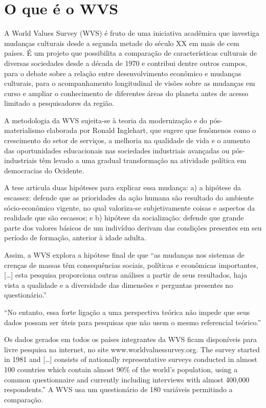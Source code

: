 \documentclass[
  brazil,
]{book}
\begin{document}
\hypertarget{o-que-uxe9-o-wvs}{%
\section{O que é o WVS}\label{o-que-uxe9-o-wvs}}

A World Values Survey (WVS) é fruto de uma iniciativa acadêmica que investiga mudanças culturais desde a segunda metade do século XX em mais de cem países. É um projeto que possibilita a comparação de características culturais de diversas sociedades desde a década de 1970 e contribui dentre outros campos, para o debate sobre a relação entre desenvolvimento econômico e mudanças culturais, para o acompanhamento longitudinal de visões sobre as mudanças em curso e ampliar o conhecimento de diferentes áreas do planeta antes de acesso limitado a pesquisadores da região.

A metodologia da WVS sujeita-se à teoria da modernização e do pós-materialismo elaborada por Ronald Inglehart, que sugere que fenômenos como o crescimento do setor de serviços, a melhoria na qualidade de vida e o aumento das oportunidades educacionais nas sociedades industriais avançadas ou pós-industriais têm levado a uma gradual transformação na atividade política em democracias do Ocidente.

A tese articula duas hipóteses para explicar essa mudança: a) a hipótese da escassez: defende que as prioridades da ação humana são resultado do ambiente sócio-econômico vigente, no qual valoriza-se subjetivamente coisas e aspectos da realidade que são escassos; e b) hipótese da socialização: defende que grande parte dos valores básicos de um indivíduo derivam das condições presentes em seu período de formação, anterior à idade adulta.

Assim, a WVS explora a hipótese final de que ``as mudanças nos sistemas de crenças de massas têm consequências sociais, políticas e econômicas importantes, {[}\ldots{]} esta pesquisa proporciona outras análises a partir de seus resultados, haja vista a qualidade e a diversidade das dimensões e perguntas presentes no questionário.'' \citep{castro_conteudo_2015}

``No entanto, essa forte ligação a uma perspectiva teórica não impede que seus dados possam ser úteis para pesquisas que não usem o mesmo referencial teórico.'' \citep{castro_conteudo_2015}

Os dados gerados em todos os países integrantes da WVS ficam disponíveis para livre pesquisa na internet, no site www.worldvaluessurvey.org. The survey started in 1981 and {[}\ldots{]} consists of nationally representative surveys conducted in almost 100 countries which contain almost 90\% of the world's population, using a common questionnaire and currently including interviews with almost 400,000 respondents.'' A WVS usa um questionário de 180 variáveis permitindo a comparação.
\end{document}
